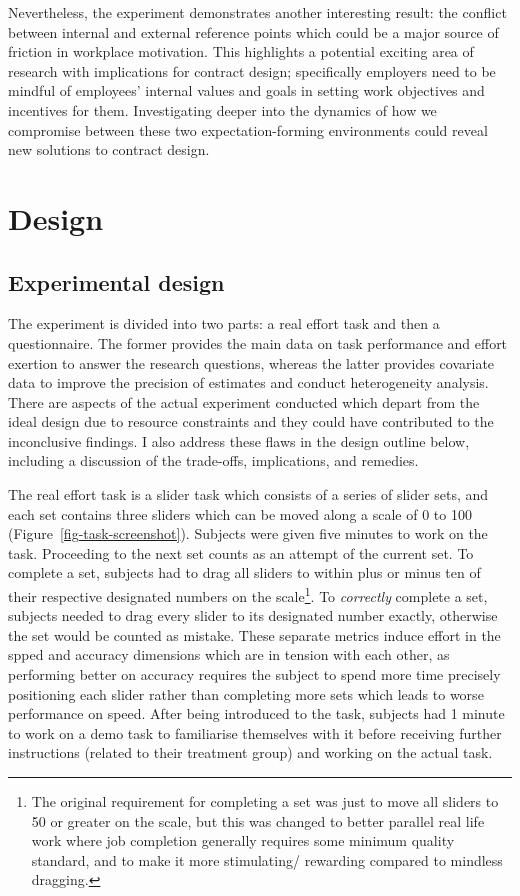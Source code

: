 \documentclass[
  12,
  letterpaper,
  DIV=11,
  numbers=noendperiod]{scrartcl}
\begin{document}
Nevertheless, the experiment demonstrates another interesting result:
the conflict between internal and external reference points which could
be a major source of friction in workplace motivation. This highlights a
potential exciting area of research with implications for contract
design; specifically employers need to be mindful of employees' internal
values and goals in setting work objectives and incentives for them.
Investigating deeper into the dynamics of how we compromise between
these two expectation-forming environments could reveal new solutions to
contract design.

\section{Design}\label{design}

\subsection{Experimental design}\label{experimental-design}

The experiment is divided into two parts: a real effort task and then a
questionnaire. The former provides the main data on task performance and
effort exertion to answer the research questions, whereas the latter
provides covariate data to improve the precision of estimates and
conduct heterogeneity analysis. There are aspects of the actual
experiment conducted which depart from the ideal design due to resource
constraints and they could have contributed to the inconclusive
findings. I also address these flaws in the design outline below,
including a discussion of the trade-offs, implications, and remedies.

The real effort task is a slider task which consists of a series of
slider sets, and each set contains three sliders which can be moved
along a scale of 0 to 100 (Figure~\ref{fig-task-screenshot}). Subjects
were given five minutes to work on the task. Proceeding to the next set
counts as an attempt of the current set. To complete a set, subjects had
to drag all sliders to within plus or minus ten of their respective
designated numbers on the scale\footnote{The original requirement for
  completing a set was just to move all sliders to 50 or greater on the
  scale, but this was changed to better parallel real life work where
  job completion generally requires some minimum quality standard, and
  to make it more stimulating/ rewarding compared to mindless dragging.}.
To \emph{correctly} complete a set, subjects needed to drag every slider
to its designated number exactly, otherwise the set would be counted as
mistake. These separate metrics induce effort in the spped and accuracy
dimensions which are in tension with each other, as performing better on
accuracy requires the subject to spend more time precisely positioning
each slider rather than completing more sets which leads to worse
performance on speed. After being introduced to the task, subjects had 1
minute to work on a demo task to familiarise themselves with it before
receiving further instructions (related to their treatment group) and
working on the actual task.
\end{document}
